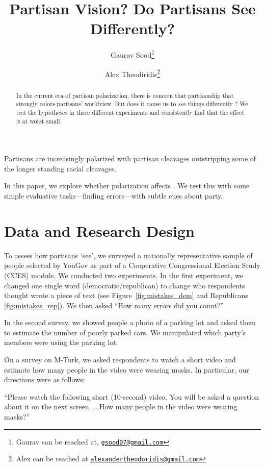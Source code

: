 \documentclass[12pt, letterpaper]{article}
\title{Partisan Vision? Do Partisans See Differently?}
\author{Gaurav Sood\thanks{Gaurav can be reached at, \href{mailto:gsood07@gmail.com}{\texttt{gsood07@gmail.com}}} \and Alex Theodiridis\thanks{Alex can be reached at \href{alexandertheodoridis@gmail.com}{\texttt{alexandertheodoridis@gmail.com}}}}
\begin{document}
\maketitle
\thispagestyle{empty}

\begin{abstract}

\noindent In the current era of partisan polarization, there is concern that partisanship that strongly colors partisans' worldview. But does it cause us to \textit{see} things differently \citep{chabris2010invisible}? We test the hypotheses in three different experiments and consistently find that the effect is at worst small.
\end{abstract}

\newpage

\doublespacing

Partisans are increasingly polarized \cite{IyengarSoodLelkes2012} with partisan cleavages outstripping some of the longer standing racial cleavages. 

In this paper, we explore whether polarization affects . We test this with some simple evaluative tasks---finding errors---with subtle cues about party.

\section{Data and Research Design}

\citep{chabris2010invisible}

To assess how partisans `see', we surveyed a nationally representative sample of people selected by YouGov \citep{rivers2007} as part of a Cooperative Congressional Election Study (CCES) module. We conducted two experiments. In the first experiment, we changed one single word (democratic/republican) to change who respondents thought wrote a piece of text (see Figure~\ref{fig:mistakes_dem} and Republicans \ref{fig:mistakes_rep}). We then asked ``How many errors did you count?''

In the second survey, we showed people a photo of a parking lot and asked them to estimate the number of poorly parked cars. We manipulated which party's members were using the parking lot. 

On a survey on M-Turk, we asked respondents to watch a short video and estimate how many people in the video were wearing masks. In particular, our directions were as follows:

``Please watch the following short (10-second) video. You will be asked a question about it on the next screen. ...How many people in the video were wearing masks?''
\end{document}
